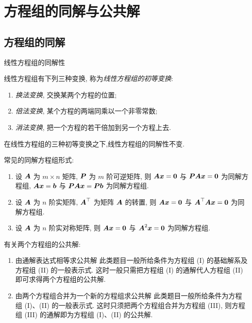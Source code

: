 \section{方程组的同解与公共解}

\subsection{方程组的同解}

线性方程组的同解性 
\begin{definition}[线性方程组的同解性]
    线性方程组有下列三种变换, 称为\textit{线性方程组的初等变换}:
    \begin{enumerate}[label=(\arabic{*})]
        \item \textit{换法变换}, 交换某两个方程的位置;
        \item \textit{倍法变换}, 某个方程的两端同乘以一个非零常数;
        \item \textit{消法变换}, 把一个方程的若干倍加到另一个方程上去.
    \end{enumerate}
    在线性方程组的三种初等变换之下,线性方程组的同解性不变.
\end{definition}

常见的同解方程组形式:
\begin{enumerate}[label=(\arabic{*})]
    \item 设 $ \vb*{A} $ 为 $ m \times n $ 矩阵, $ \vb*{P} $ 为 $ m $ 阶可逆矩阵, 则 $ \vb*{A x}=\mathbf{0} $ 与 $ \vb*{P A x}=\mathbf{0} $ 为同解方程组, $ \vb*{A x}=\vb*{b} $ 与 $ \vb*{P A x}=\vb*{P b} $ 为同解方程组.
    \item 设 $ \vb*{A} $ 为 $ n $ 阶实矩阵, $ \vb*{A}^{\top} $ 为矩阵 $ \vb*{A} $ 的转置, 则 $ \vb*{A x}=\vb*{0} $ 与 $ \vb*{A}^{\top} \vb*{A x}=\vb*{0} $ 为同解方程组.
    \item 设 $ \vb*{A} $ 为 $ n $ 阶实对称矩阵, 则 $ \vb*{A x}=\vb*{0} $ 与 $ \vb*{A}^{2} \vb*{x}=\mathbf{0} $ 为同解方程组.
\end{enumerate}

有关两个方程组的公共解:
\begin{enumerate}[label=(\arabic{*})]
    \item 由通解表达式相等求公共解 此类题目一般所给条件为方程组 (I) 的基础解系及方程组 (II) 的一般表示式. 这时一般只需把方程组 (I) 的通解代人方程组 (II) 即可求得两个方程组的公共解.
    \item 由两个方程组合并为一个新的方程组求公共解 此类题目一般所给条件为方程组 (I)、(II) 的一般表示式. 这时只须把两个方程组合并为方程组 (III), 则方程组 (III) 的通解即为方程组 (I)、(II) 的公共解. 
\end{enumerate}

